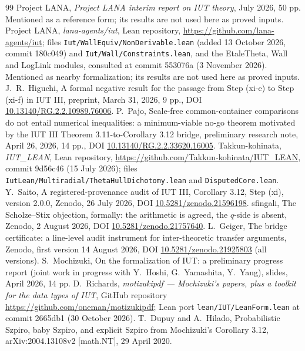 \documentclass[11pt]{article}
\theoremstyle{definition}
\begin{document}
\begin{thebibliography}{99}
 Project LANA, \emph{Project LANA interim report on IUT theory}, July 2026, 50 pp. Mentioned as a reference form; its results are not used here as proved inputs.
 Project LANA, \emph{lana-agents/iut}, Lean repository, \url{https://github.com/lana-agents/iut}; files \texttt{Iut/WallEquiv/NonDerivable.lean} (added 13 October 2026, commit 180c049) and \texttt{Iut/Wall/Constraints.lean}, and the EtaleTheta, Wall and LogLink modules, consulted at commit 553076a (3 November 2026). Mentioned as nearby formalization; its results are not used here as proved inputs.
 J.~R.~Higuchi, A formal negative result for the passage from Step (xi-e) to Step (xi-f) in IUT III, preprint, March 31, 2026, 9 pp., DOI \href{https://doi.org/10.13140/RG.2.2.10989.76006}{10.13140/RG.2.2.10989.76006}.
 P.~Pajo, Scale-free common-container comparisons do not entail numerical inequalities: a minimum-viable no-go theorem motivated by the IUT III Theorem 3.11-to-Corollary 3.12 bridge, preliminary research note, April 26, 2026, 14 pp., DOI \href{https://doi.org/10.13140/RG.2.2.33620.16005}{10.13140/RG.2.2.33620.16005}.
 Takkun-kohinata, \emph{IUT\_LEAN}, Lean repository, \url{https://github.com/Takkun-kohinata/IUT_LEAN}, commit 9d56c46 (15 July 2026); files \texttt{IutLean/Multiradial/ThetaHullDichotomy.lean} and \texttt{DisputedCore.lean}.
 Y.~Saito, A registered-provenance audit of IUT III, Corollary 3.12, Step (xi), version 2.0.0, Zenodo, 26 July 2026, DOI \href{https://doi.org/10.5281/zenodo.21596198}{10.5281/zenodo.21596198}.
 sfingali, The Scholze--Stix objection, formally: the arithmetic is agreed, the $q$-side is absent, Zenodo, 2 August 2026, DOI \href{https://doi.org/10.5281/zenodo.21757640}{10.5281/zenodo.21757640}.
 L.~Geiger, The bridge certificate: a line-level audit instrument for inter-theoretic transfer arguments, Zenodo, first version 14 August 2026, DOI \href{https://doi.org/10.5281/zenodo.21925803}{10.5281/zenodo.21925803} (all versions).
 S.~Mochizuki, On the formalization of IUT: a preliminary progress report (joint work in progress with Y.~Hoshi, G.~Yamashita, Y.~Yang), slides, April 2026, 14 pp.
 D.~Richards, \emph{motizukipdf --- Mochizuki's papers, plus a toolkit for the data types of IUT}, GitHub repository \url{https://github.com/oneman/motizukipdf}; Lean port \texttt{lean/IUT/LeanForm.lean} at commit 2665db1 (30 October 2026).
 T.~Dupuy and A.~Hilado, Probabilistic Szpiro, baby Szpiro, and explicit Szpiro from Mochizuki's Corollary 3.12, arXiv:2004.13108v2 [math.NT], 29 April 2020.

\end{thebibliography}
\end{document}
